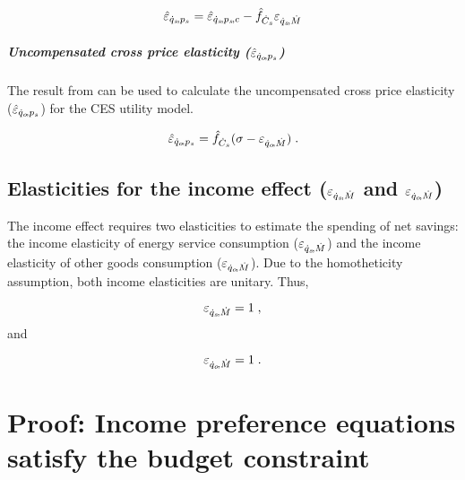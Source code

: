 \documentclass[12pt]{article}\usepackage[]{graphicx}\usepackage[]{xcolor}
\begin{document}
\begin{equation} \label{eq:eqspsUC_exact}
  \hat{\varepsilon}_{\dot{q}_s\!,p_s} = \hat{\varepsilon}_{\dot{q}_s\!,p_s\!,c} - \hat{f}_{\dot{C}_s} \varepsilon_{\dot{q}_s\!,\dot{M}}
\end{equation}


\subparagraph{Uncompensated cross price elasticity ($\hat{\varepsilon}_{\dot{q}_o\!,p_s}$)} 

The result from \citet{Hicks1934} can be used to 
calculate the uncompensated cross price elasticity ($\hat{\varepsilon}_{\dot{q}_o\!,p_s}$)
for the CES utility model.

\begin{equation} \label{eq:eqopsUC_exact}
  \hat{\varepsilon}_{\dot{q}_o\!,p_s} = \hat{f}_{\dot{C}_s} (\sigma - \varepsilon_{\dot{q}_o\!,\dot{M}}) \; .
\end{equation}


\subsection{Elasticities for the income effect ($\varepsilon_{\dot{q}_s\!,\dot{M}}$ and $\varepsilon_{\dot{q}_o\!,\dot{M}}$)}
\label{sec:income_elasticities}

The income effect requires two elasticities to 
estimate the spending of net savings:
the income elasticity of energy service consumption ($\varepsilon_{\dot{q}_s\!,\dot{M}}$) and
the income elasticity of other goods consumption ($\varepsilon_{\dot{q}_o\!,\dot{M}}$).
Due to the homotheticity assumption,
both income elasticities are unitary. 
Thus, 

\begin{equation} \label{eq:eqsM}
  \varepsilon_{\dot{q}_s\!,\dot{M}} = 1 \; ,
\end{equation}
%
and

\begin{equation} \label{eq:eqoM}
  \varepsilon_{\dot{q}_o\!,\dot{M}} = 1 \; .
\end{equation}







\section{Proof: Income preference equations satisfy the budget constraint}
\label{sec:proof_income_elasticities}





\end{document}
